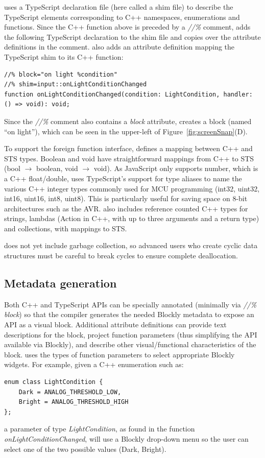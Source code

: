 \MC uses a TypeScript declaration file (here called a shim file) to describe the TypeScript
elements corresponding to C++ namespaces, enumerations and functions.
Since the C++ function above is preceded by a \emph{//\%} comment,
\MC adds the following TypeScript declaration to the shim file and copies
over the attribute definitions in the comment. \MC also adds an attribute definition mapping
the TypeScript shim to its C++ function:

\begin{lstlisting}
//% block="on light %condition"
//% shim=input::onLightConditionChanged
function onLightConditionChanged(condition: LightCondition, handler: () => void): void;
\end{lstlisting}

Since the \emph{//\%} comment also contains a \emph{block} attribute, \MC creates a block (named ``on light''), which can be seen in the upper-left of Figure~\ref{fig:screenSnap}(D).

To support the foreign function interface, \MC defines a mapping between C++ and STS types.
Boolean and void have straightforward mappings from C++ to STS (bool $\rightarrow$ boolean, void $\rightarrow$ void).
As JavaScript only supports number, which is a C++ float/double, \MC uses TypeScript's support
for type aliases to name the various C++ integer types commonly used for MCU programming
(int32, uint32, int16, uint16, int8, uint8).
This is particularly useful for saving space on 8-bit architectures such as the AVR.
\MC also includes reference counted C++ types for strings, lambdas (Action in C++, with
up to three arguments and a return type) and collections, with mappings to STS.

\MC does not yet include garbage collection, so advanced users who create cyclic
data structures must be careful to break cycles to ensure complete deallocation.

\subsection{Metadata generation}

Both C++ and TypeScript APIs can be specially annotated (minimally via
\emph{//\% block}) so that the \MC compiler generates the needed
Blockly metadata to expose an API as a visual block.
Additional attribute definitions can provide text descriptions for the block, project function
parameters (thus simplifying the API available via Blockly), and describe other visual/functional
characteristics of the block.  \MC uses the types of function parameters to select appropriate
Blockly widgets.  For example, given a C++ enumeration such as:
\begin{lstlisting}
enum class LightCondition {
    Dark = ANALOG_THRESHOLD_LOW,
    Bright = ANALOG_THRESHOLD_HIGH
};
\end{lstlisting}
a parameter of type \emph{LightCondition}, as found in
the function \emph{onLightConditionChanged}, will use a Blockly drop-down menu
so the user can select one of the two possible values (Dark, Bright).

